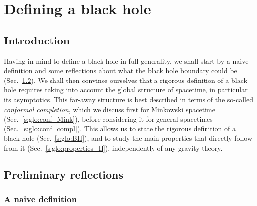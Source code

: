 \chapter{Defining a black hole}
\label{s:glo}

\minitoc

\section{Introduction}

Having in mind to define a black hole in full generality, we shall start by a naive definition
and some reflections about what the black hole boundary could be (Sec.~\ref{s:def:BH_null_hypsurf}).
We shall then convince ourselves that a rigorous definition of a black hole
requires taking into account the global structure of spacetime, in particular its
asymptotics.  This far-away structure is best
described in terms of the so-called \emph{conformal completion}, which we
discuss first for Minkowski spacetime (Sec.~\ref{s:glo:conf_Mink}),
before considering it for general spacetimes (Sec.~\ref{s:glo:conf_compl}).
This allows us to state the rigorous definition of a black hole (Sec.~\ref{s:glo:BH}),
and to study the main properties that directly follow from it (Sec.~\ref{s:glo:properties_H}),
independently of any gravity theory.



\section{Preliminary reflections} \label{s:def:BH_null_hypsurf}

\subsection{A naive definition} \label{s:def:first_defin}


